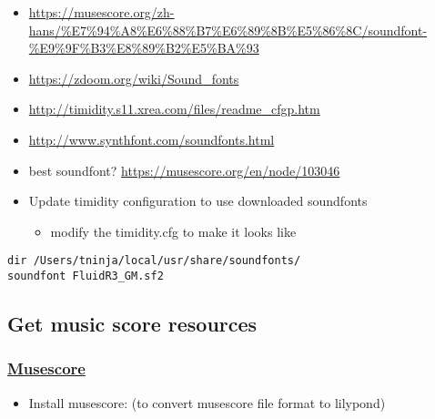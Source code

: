 \documentclass[11pt]{article}
\begin{document}
\begin{itemize}
\item \url{https://musescore.org/zh-hans/\%E7\%94\%A8\%E6\%88\%B7\%E6\%89\%8B\%E5\%86\%8C/soundfont-\%E9\%9F\%B3\%E8\%89\%B2\%E5\%BA\%93}
\item \url{https://zdoom.org/wiki/Sound\_fonts}
\item \url{http://timidity.s11.xrea.com/files/readme\_cfgp.htm}
\item \url{http://www.synthfont.com/soundfonts.html}
\item best soundfont? \url{https://musescore.org/en/node/103046}

\item Update timidity configuration to use downloaded soundfonts
\begin{itemize}
\item modify the timidity.cfg to make it looks like
\end{itemize}
\end{itemize}

\begin{verbatim}
dir /Users/tninja/local/usr/share/soundfonts/
soundfont FluidR3_GM.sf2
\end{verbatim}

\subsection{Get music score resources}
\label{sec:org1df4d1b}

\subsubsection{\href{https://musescore.com}{Musescore}}
\label{sec:orgf11c8b9}

\begin{itemize}
\item Install musescore: (to convert musescore file format to lilypond)
\end{itemize}
\end{document}

